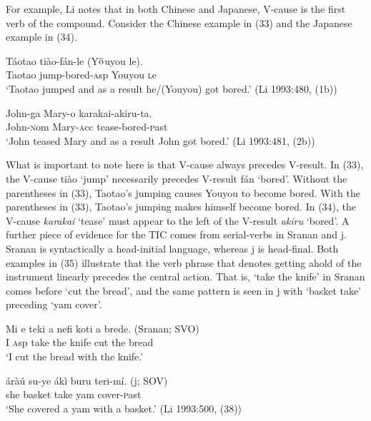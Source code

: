 \documentclass[output=paper]{LSP/langsci}
\begin{document}
For example, Li notes that in both Chinese and Japanese, V-cause is the first verb of the compound. Consider the Chinese example in (33) and the Japanese example in (34).

 \begin{exe}
 
 \ex \gll T\'{a}otao ti\`{a}o-f\'{a}n-le (Y$\overline{\rm{o}}$uyou le).\\
 Taotao jump-bored-{\textsc asp} Youyou {\textsc le}\\
 \glt `Taotao jumped and as a result he/(Youyou) got bored.' (Li 1993:480, (1b))
 
 \ex \gll John-ga Mary-o karakai-akiru-ta.\\
 John-{\textsc nom} Mary-{\textsc acc} tease-bored-{\textsc past}\\
 \glt `John teased Mary and as a result John got bored.'  (Li 1993:481, (2b))
 
 \end{exe}

What is important to note here is that V-cause always precedes V-result. In (33), the V-cause ti\`ao `jump' necessarily precedes V-result f\'an `bored'. Without the parentheses in (33), Taotao's jumping causes Youyou to become bored. With the parentheses in (33), Taotao's jumping makes himself become bored. In (34), the V-cause \textit{karakai} `tease' must appear to the left of the V-result \textit{akiru} `bored'. A further piece of evidence for the TIC comes from serial-verbs in Sranan and j. Sranan is syntactically a head-initial language, whereas j is head-final. Both examples in (35) illustrate that the verb phrase that denotes getting ahold of the instrument linearly precedes the central action. That is, `take the knife' in Sranan comes before `cut the bread', and the same pattern is seen in j with `basket take' preceding `yam cover'.

\begin{exe}
\ex
\begin{xlist}

\ex \gll Mi e teki a nefi koti a brede. \hspace{2cm} (Sranan; SVO)\\
I {\textsc asp} take the knife cut the bread \\
\glt `I cut the bread with the knife.'

\ex \gll \'{a}r\`{a}\'{u} su-ye \'{a}k\`{i} buru teri-m\'{i}. \hspace{2.6cm} (j; SOV)\\
she basket take yam cover-{\textsc past}\\
\glt `She covered a yam with a basket.' (Li 1993:500, (38))

\end{xlist}
\end{exe}
\end{document}
